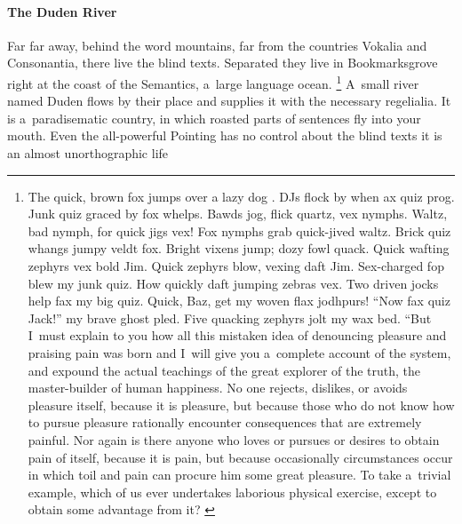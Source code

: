 \documentclass[11pt, a4paper, oneside]{article}
\renewcommand{\caps}[1]{{\textscale{0.97}{\textls[50]{\MakeUppercase{#1}}}}}
\theoremstyle{Plain}
\theoremstyle{Definition}
\theoremstyle{Remark}
\begin{document}
\paragraph{The Duden River}
\label{sec:tests:lorem-ipsum:main:duden}
Far far away, behind the word mountains, far from the countries Vokalia and Consonantia, there live the blind texts. Separated they live in Bookmarksgrove right at the coast of the Semantics, a~large language ocean.%
\footnote{The quick, brown fox jumps over a lazy dog \citep{knuth:ct:b, knuth:ct:c}. DJs flock by when \caps{MTV} ax quiz prog. Junk \caps{MTV} quiz graced by fox whelps. Bawds jog, flick quartz, vex nymphs. Waltz, bad nymph, for quick jigs vex! Fox nymphs grab quick-jived waltz. Brick quiz whangs jumpy veldt fox. Bright vixens jump; dozy fowl quack. Quick wafting zephyrs vex bold Jim. Quick zephyrs blow, vexing daft Jim. Sex-charged fop blew my junk \caps{TV} quiz. How quickly daft jumping zebras vex. Two driven jocks help fax my big quiz. Quick, Baz, get my woven flax jodhpurs! ``Now fax quiz Jack!'' my brave ghost pled. Five quacking zephyrs jolt my wax bed. ``But I~must explain to you how all this mistaken idea of denouncing pleasure and praising pain was born and I~will give you a~complete account of the system, and expound the actual teachings of the great explorer of the truth, the master-builder of human happiness. No one rejects, dislikes, or avoids pleasure itself, because it is pleasure, but because those who do not know how to pursue pleasure rationally encounter consequences that are extremely painful. Nor again is there anyone who loves or pursues or desires to obtain pain of itself, because it is pain, but because occasionally circumstances occur in which toil and pain can procure him some great pleasure. To take a~trivial example, which of us ever undertakes laborious physical exercise, except to obtain some advantage from it? %
\citep[210.]{cicero}}
A~small river named Duden flows by their place and supplies it with the necessary regelialia. It is a~paradisematic country, in which roasted parts of sentences fly into your mouth. Even the all-powerful Pointing has no control about the blind texts it is an almost unorthographic life
\end{document}
